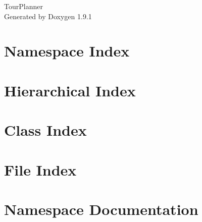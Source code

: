 \let\mypdfximage\pdfximage\def\pdfximage{\immediate\mypdfximage}\documentclass[twoside]{book}
\newcommand{\+}{\discretionary{\mbox{\scriptsize$\hookleftarrow$}}{}{}}
\newcommand{\clearemptydoublepage}{%
  \newpage{\pagestyle{empty}\cleardoublepage}%
}
\begin{document}
\raggedbottom

\hypersetup{pageanchor=false,
             bookmarksnumbered=true,
             pdfencoding=unicode
            }
\begin{titlepage}
\vspace*{7cm}
\begin{center}%
{\Large Tour\+Planner }\\
\vspace*{1cm}
{\large Generated by Doxygen 1.9.1}\\
\end{center}
\end{titlepage}
\clearemptydoublepage
{}
\tableofcontents
\clearemptydoublepage
{}
\hypersetup{pageanchor=true}

\chapter{Namespace Index}

\chapter{Hierarchical Index}

\chapter{Class Index}

\chapter{File Index}

\chapter{Namespace Documentation}












\end{document}
